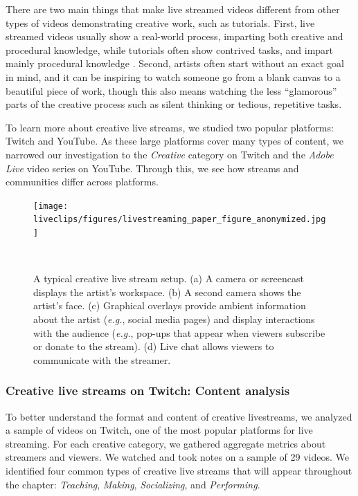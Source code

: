 There are two main things that make live streamed videos different from other types of videos demonstrating creative work, such as tutorials. First, live streamed videos usually show a real-world process, imparting both creative and procedural knowledge, while tutorials often show contrived tasks, and impart mainly procedural knowledge \cite{Torrey2007}. Second, artists often start without an exact goal in mind, and it can be inspiring to watch someone go from a blank canvas to a beautiful piece of work, though this also means watching the less ``glamorous'' parts of the creative process such as silent thinking or tedious, repetitive tasks.

To learn more about creative live streams, we studied two popular platforms: Twitch and YouTube. As these large platforms cover many types of content, we narrowed our investigation to the \textit{Creative} category on Twitch and the \textit{Adobe Live} video series on YouTube. Through this, we see how streams and communities differ across platforms.  

\begin{figure}[b!]
\centering
  \texttt{[image: liveclips/figures/livestreaming\_paper\_figure\_anonymized.jpg]}
  \caption[A typical creative live stream setup.]{A typical creative live stream setup. (a) A camera or screencast displays the artist's workspace. (b) A second camera shows the artist's face. (c) Graphical overlays provide ambient information about the artist (\textit{e.g.}, social media pages) and display interactions with the audience (\textit{e.g.}, pop-ups that appear when viewers subscribe or donate to the stream). (d) Live chat allows viewers to communicate with the streamer. }~\label{fig:livestreaming_view}
\end{figure}

\subsubsection{Creative live streams on Twitch: Content analysis}
To better understand the format and content of creative live\-streams, we analyzed a sample of videos on Twitch, one of the most popular platforms for live streaming. For each creative category, we gathered aggregate metrics about streamers and viewers. We watched and took notes on a sample of 29 videos. We identified four common types of creative live streams that will appear throughout the chapter: \textit{Teaching}, \textit{Making}, \textit{Socializing}, and \textit{Performing}.

